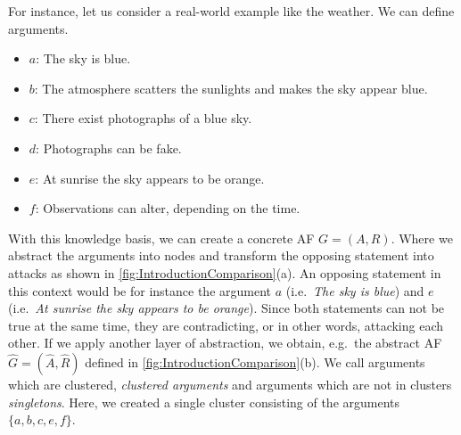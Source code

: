 For instance, let us consider a real-world example like the weather. We can define arguments.

\begin{itemize}
    \item $a$: The sky is blue.
    \item $b$: The atmosphere scatters the sunlights and makes the sky appear blue.
    \item $c$: There exist photographs of a blue sky.
    \item $d$: Photographs can be fake.
    \item $e$: At sunrise the sky appears to be orange.
    \item $f$: Observations can alter, depending on the time.
\end{itemize}

With this knowledge basis, we can create a concrete AF $G=(A, R)$. Where we abstract the arguments into nodes and transform the opposing statement into attacks as shown in \cref{fig:IntroductionComparison}(a). An opposing statement in this context would be for instance the argument $a$ (i.e.\ \emph{The sky is blue}) and $e$ (i.e.\ \emph{At sunrise the sky appears to be orange}). Since both statements can not be true at the same time, they are contradicting, or in other words, attacking each other. If we apply another layer of abstraction, we obtain, e.g.\ the abstract AF $\hat{G}=(\hat{A}, \hat{R})$ defined in \cref{fig:IntroductionComparison}(b). We call arguments which are clustered, \emph{clustered arguments} and arguments which are not in clusters \emph{singletons}. Here, we created a single cluster consisting of the arguments $\{a, b, c, e, f\}$.



